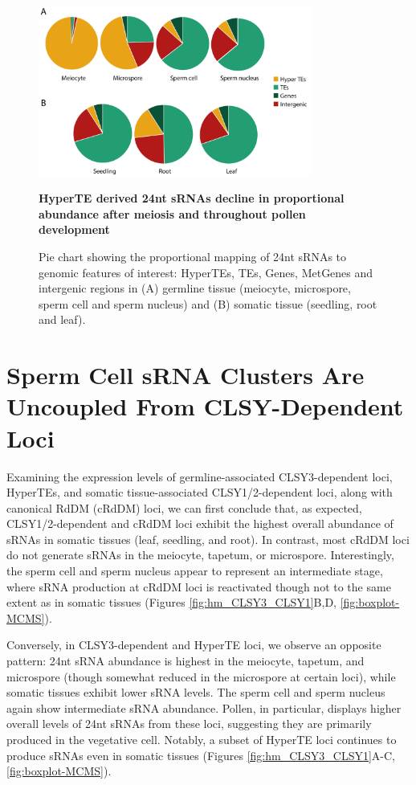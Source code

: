 \begin{figure}[htbp!] 
\centering    
    \includegraphics[width=0.8\textwidth]{Chapter2/Figs/Figure7_Pie_charts.pdf}
\caption{\textbf{HyperTE derived 24nt sRNAs decline in proportional abundance after meiosis and throughout pollen development}}
\label{fig:sRNA_pie}
\captionsetup{font=small}
    \caption*{Pie chart showing the proportional mapping of 24nt sRNAs to genomic features of interest: HyperTEs, TEs, Genes, MetGenes and intergenic regions in (A) germline tissue (meiocyte, microspore, sperm cell and sperm nucleus) and (B) somatic tissue (seedling, root and leaf).}
\end{figure}

\section{Sperm Cell sRNA Clusters Are Uncoupled From CLSY-Dependent Loci}

Examining the expression levels of germline-associated CLSY3-dependent loci, HyperTEs, and somatic tissue-associated CLSY1/2-dependent loci, along with canonical RdDM (cRdDM) loci, we can first conclude that, as expected, CLSY1/2-dependent and cRdDM loci exhibit the highest overall abundance of sRNAs in somatic tissues (leaf, seedling, and root). In contrast, most cRdDM loci do not generate sRNAs in the meiocyte, tapetum, or microspore. Interestingly, the sperm cell and sperm nucleus appear to represent an intermediate stage, where sRNA production at cRdDM loci is reactivated though not to the same extent as in somatic tissues (Figures \ref{fig:hm_CLSY3_CLSY1}B,D, \ref{fig:boxplot-MCMS}).

Conversely, in CLSY3-dependent and HyperTE loci, we observe an opposite pattern: 24nt sRNA abundance is highest in the meiocyte, tapetum, and microspore (though somewhat reduced in the microspore at certain loci), while somatic tissues exhibit lower sRNA levels. The sperm cell and sperm nucleus again show intermediate sRNA abundance. Pollen, in particular, displays higher overall levels of 24nt sRNAs from these loci, suggesting they are primarily produced in the vegetative cell. Notably, a subset of HyperTE loci continues to produce sRNAs even in somatic tissues (Figures \ref{fig:hm_CLSY3_CLSY1}A-C, \ref{fig:boxplot-MCMS}).

